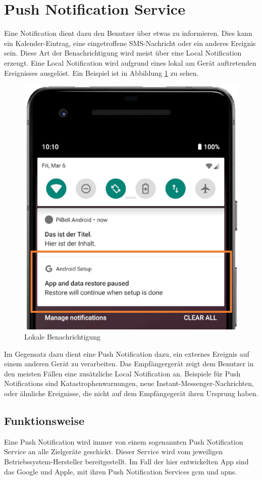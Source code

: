 \label{ch:push}
\section{Push Notification Service}
Eine Notification dient dazu den Benutzer über etwas zu informieren. Dies kann ein Kalender-Eintrag, eine eingetroffene SMS-Nachricht oder ein anderes Ereignis sein. Diese Art der Benachrichtigung wird meist über eine Local Notification erzeugt. Eine Local Notification wird aufgrund eines lokal am Gerät auftretenden Ereignisses ausgelöst. Ein Beispiel ist in Abbildung \ref{fig:local-notification} zu sehen.
\begin{figure}
    \centering\includegraphics[width=.5\linewidth]{images/xamarin/LocalNotification.png}
    \caption{Lokale Benachrichtigung}
    \label{fig:local-notification}
\end{figure}

Im Gegensatz dazu dient eine Push Notification dazu, ein externes Ereignis auf einem anderen Gerät zu verarbeiten.
Das Empfängergerät zeigt dem Benutzer in den meisten Fällen eine zusätzliche Local Notification an.
Beispiele für Push Notifications sind Katastrophenwarnungen, neue Instant-Messenger-Nachrichten, oder ähnliche Ereignisse, die nicht auf dem Empfängegerät ihren Ursprung haben.

\subsection{Funktionsweise}
Eine Push Notification wird immer von einem sogenannten Push Notification Service an alle Zielgeräte geschickt.
Dieser Service wird vom jeweiligen Betriebssystem-Hersteller bereitgestellt.
Im Fall der hier entwickelten App sind das Google und Apple, mit ihren Push Notification Services \ac{gcm} und \ac{apns}.\par

